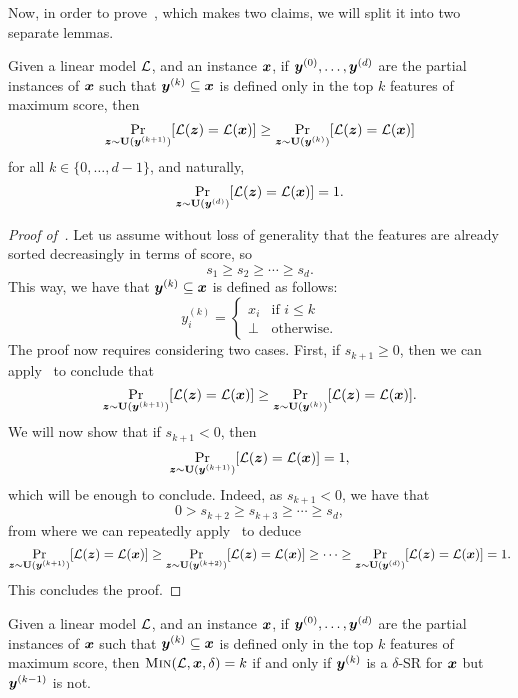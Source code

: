 Now, in order to prove~, which makes two claims, we will split it into two separate lemmas. 
\begin{lemma}\label{lemma:greedy-1}
    Given a linear model $\mathcal{L}$, and an instance ${\bm{x}}$, if ${\bm{y}}^{(0)}, \ldots, {\bm{y}}^{(d)}$ are the partial instances of ${\bm{x}}$ such that ${\bm{y}}^{(k)} \subseteq {\bm{x}}$ is defined only in the top $k$ features of maximum score, then
    \[ 
        \Pr_{{\bm{z}} \sim \mathbf{U}({\bm{y}}^{(k+1)})}[\mathcal{L}({\bm{z}}) = \mathcal{L}({\bm{x}})] \geq \Pr_{{\bm{z}} \sim \mathbf{U}({\bm{y}}^{(k)})}[\mathcal{L}({\bm{z}}) = \mathcal{L}({\bm{x}})]
    \]
    for all $k \in \{0, \ldots, d-1\}$, and naturally, 
    \[ 
    \Pr_{{\bm{z}} \sim \mathbf{U}({\bm{y}}^{(d)})}[\mathcal{L}({\bm{z}}) = \mathcal{L}({\bm{x}})] = 1.
    \]
\end{lemma}
\begin{proof}[Proof of~]
Let us assume without loss of generality that the features are already sorted decreasingly in terms of score, so \[s_1 \geq s_2 \geq \cdots \geq s_d.\]
This way, we have that ${\bm{y}}^{(k)} \subseteq {\bm{x}}$ is defined as follows:
\[ 
    y^{(k)}_i = \begin{cases}
        x_i & \text{if } i \leq k\\
        \bot & \text{otherwise}.
    \end{cases}
\]
The proof now requires considering two cases. First, if $s_{k+1} \geq 0$, then we can apply~ to conclude that
\[ 
    \Pr_{{\bm{z}} \sim \mathbf{U}({\bm{y}}^{(k+1)})}[\mathcal{L}({\bm{z}}) = \mathcal{L}({\bm{x}})] \geq \Pr_{{\bm{z}} \sim \mathbf{U}({\bm{y}}^{(k)})}[\mathcal{L}({\bm{z}}) = \mathcal{L}({\bm{x}})].
\]
We will now show that if $s_{k+1} < 0$, then 
\[ 
    \Pr_{{\bm{z}} \sim \mathbf{U}({\bm{y}}^{(k+1)})}[\mathcal{L}({\bm{z}}) = \mathcal{L}({\bm{x}})] = 1,
\]
which will be enough to conclude. Indeed, as $s_{k+1} < 0$, we have that 
\[
   0 > s_{k+2} \geq s_{k+3} \geq \cdots \geq s_d, 
\]
from where we can repeatedly apply~ to deduce 
\[ 
    \Pr_{{\bm{z}} \sim \mathbf{U}({\bm{y}}^{(k+1)})}[\mathcal{L}({\bm{z}}) = \mathcal{L}({\bm{x}})]  \geq \Pr_{{\bm{z}} \sim \mathbf{U}({\bm{y}}^{(k+2)})}[\mathcal{L}({\bm{z}}) = \mathcal{L}({\bm{x}})] \geq \cdots \geq \Pr_{{\bm{z}} \sim \mathbf{U}({\bm{y}}^{(d)})}[\mathcal{L}({\bm{z}}) = \mathcal{L}({\bm{x}})] = 1.
\]
This concludes the proof.
\end{proof}
\begin{lemma}\label{lemma:greedy-2}
    Given a linear model $\mathcal{L}$, and an instance ${\bm{x}}$, if ${\bm{y}}^{(0)}, \ldots, {\bm{y}}^{(d)}$ are the partial instances of ${\bm{x}}$ such that ${\bm{y}}^{(k)} \subseteq {\bm{x}}$ is defined only in the top $k$ features of maximum score, then $\operatorname{\textnormal{\textsc{Min}}}(\mathcal{L}, {\bm{x}}, \delta) = k$ if and only if ${\bm{y}}^{(k)}$ is a $\delta$-SR for ${\bm{x}}$ but ${\bm{y}}^{(k-1)}$ is not. 
\end{lemma}

